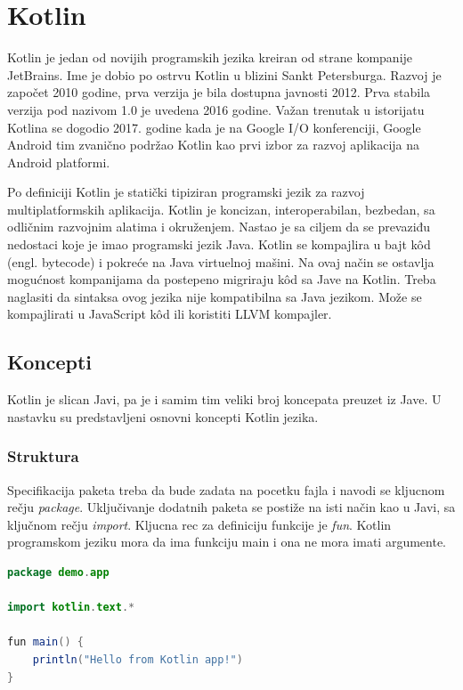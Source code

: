 \documentclass[12pt,oneside]{memoir}
\begin{document}
\section{Kotlin}
Kotlin je jedan od novijih programskih jezika kreiran od strane kompanije JetBrains. Ime je dobio po ostrvu Kotlin u blizini Sankt Petersburga. Razvoj je započet 2010 godine, prva verzija je bila dostupna javnosti 2012. Prva stabila verzija pod nazivom 1.0 je uvedena 2016 godine. Važan trenutak u istorijatu Kotlina se dogodio 2017. godine kada je na Google I/O konferenciji, Google Android tim zvanično podržao Kotlin kao prvi izbor za razvoj aplikacija na Android platformi. 
 
 
Po definiciji Kotlin je statički tipiziran programski jezik za razvoj multiplatformskih aplikacija. Kotlin je koncizan, interoperabilan, bezbedan, sa odličnim razvojnim alatima i okruženjem. Nastao je sa ciljem da se prevaziđu nedostaci koje je imao programski jezik Java. Kotlin se kompajlira u bajt kôd (engl. bytecode) i pokreće na Java virtuelnoj mašini. Na ovaj način se ostavlja mogućnost kompanijama da postepeno migriraju kôd sa Jave na Kotlin. Treba naglasiti da sintaksa ovog jezika nije kompatibilna sa Java jezikom. Može se kompajlirati u JavaScript kôd ili koristiti LLVM kompajler.

 
\subsection{Koncepti}
Kotlin je slican Javi, pa je i samim tim veliki broj koncepata preuzet iz Jave. U nastavku su predstavljeni osnovni koncepti Kotlin jezika. 
\subsubsection{Struktura}
Specifikacija paketa treba da bude zadata na pocetku fajla i navodi se kljucnom rečju \emph{package}. Uključivanje dodatnih paketa se postiže na isti način kao u Javi, sa ključnom rečju \emph{import}. Kljucna rec za definiciju funkcije je \emph{fun}. Kotlin programskom jeziku mora da ima funkciju main i ona ne mora imati argumente. 
 
\begin{lstlisting}[caption={Struktura Kotlin dokumenta},captionpos=t, language=Java]
package demo.app
 
import kotlin.text.*
 
fun main() {
    println("Hello from Kotlin app!")
}
\end{lstlisting}
 
\end{document}
